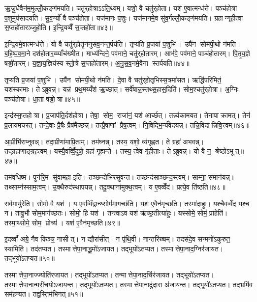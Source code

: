 ऋ॒जु॒धैवैन॑म॒मुल्लोँ॒कङ्ग॑मयति। चतु॑र्‌होत्राऽऽति॒थ्यम्। यशो॒ वै चतु॑र्‌होता। यश॑ ए॒वात्मन्ध॑त्ते। पञ्च॑होत्रा प॒शुमुप॑सादयति। सु॒व॒र्ग्यो॑ वै पञ्च॑होता। यज॑मानः प॒शुः। यज॑मानमे॒व सु॑व॒र्गल्लोँ॒कङ्ग॑मयति। ग्रहान्गृही॒त्वा स॒प्तहो॑तारञ्जुहोति। इ॒न्द्रि॒यव्वैँ स॒प्तहो॑ता॥४३॥

इ॒न्द्रि॒यमे॒वात्मन्ध॑त्ते। यो वै चतु॑र्‌होतॄननुसव॒नन्त॒र्पय॑ति। तृप्य॑ति प्र॒जया॑ प॒शुभि॑। उपै॑न सोमपी॒थो न॑मति। ब॒हि॒ष्प॒व॒मा॒ने दश॑होतार॒व्व्याँच॑ख्षीत। माध्य॑न्दिने॒ पव॑माने॒ चतु॑र्‌होतारम्। आर्भ॑वे॒ पव॑माने॒ पञ्च॑होतारम्। पि॒तृ॒य॒ज्ञे षड्ढो॑तारम्। य॒ज्ञा॒य॒ज्ञिय॑स्य स्तो॒त्रे स॒प्तहो॑तारम्। अ॒नु॒स॒व॒नमे॒वैना स्तर्पयति॥४४॥

तृप्य॑ति प्र॒जया॑ प॒शुभि॑। उपै॑न सोमपी॒थो न॑मति। दे॒वा वै चतु॑र्‌होतृभिस्स॒त्रमा॑सत। ऋद्धि॑परिमितं॒ यश॑स्कामाः। तेऽब्रुवन्न्। यन्न॑ प्रथ॒मय्यँश॑ ऋ॒च्छात्। सर्वे॑षान्न॒स्तथ्स॒हास॒दिति॑। सोम॒श्चतु॑र्‌होत्रा। अ॒ग्निः पञ्च॑होत्रा। धा॒ता षड्ढोत्रा॥४५॥

इन्द्र॑स्स॒प्तहोत्रा। प्र॒जाप॑ति॒र्दश॑होत्रा। तेषा॒ सोम॒ राजा॑नं॒ यश॑ आर्च्छत्। तन्न्य॑कामयत। तेनापाक्रामत्। तेन॑ प्र॒लाय॑मचरत्। तन्दे॒वाः प्रै॒षैः प्रैष॑मैच्छन्न्। तत्प्रै॒षाणां प्रैष॒त्वम्। नि॒विद्भि॒र्न्य॑वेदयन्न्। तन्नि॒विदान्निवि॒त्त्वम्॥४६॥

आ॒प्रीभि॑राप्नुवन्न्। तदा॒प्रीणा॑माप्रि॒त्वम्। तम॑घ्नन्न्। तस्य॒ यशो॒ व्य॑गृह्णत। ते ग्रहा॑ अभवन्न्। तद्ग्रहा॑णाङ्ग्रह॒त्वम्। यस्यै॒वव्विँ॒दुषो॒ ग्रहा॑ गृ॒ह्यन्ते। तस्य॒ त्वे॑व गृ॑ही॒ताः। तेऽब्रुवन्न्। यो वै न॒ श्रेष्ठोऽभूत्॥४७॥

तम॑वधिष्म। पुन॑रि॒म सु॑वामहा॒ इति॑। तञ्छन्दो॑भिरसुवन्त। तच्छन्द॑साञ्छन्द॒स्त्वम्। साम्ना॒ समान॑यन्न्। तथ्साम्न॑स्साम॒त्वम्। उ॒क्थैरुद॑स्थापयन्न्। तदु॒क्थाना॑मुक्थ॒त्वम्। य ए॒वव्वेँद॑। प्रत्ये॒व ति॑ष्ठति॥४८॥

सर्व॒मायु॑रेति। सोमो॒ वै यश॑। य ए॒वव्विँ॒द्वान्थ्सोम॑मा॒गच्छ॑ति। यश॑ ए॒वैन॑मृच्छति। तस्मा॑दाहुः। यश्चै॒वव्वेँद॒ यश्च॒ न। तावु॒भौ सोम॒माग॑च्छतः। सोमो॒ हि यश॑। तन्त्वाऽव यश॑ ऋच्छ॒तीत्या॑हुः। यस्सोमे॒ सोमं॒ प्राहेति॑। तस्मा॒थ्सोमे॒ सोम॒ प्रोच्य॑। यश॑ ए॒वैन॑मृच्छति॥४९॥

इ॒दव्वाँ अग्रे॒ नैव किञ्च॒ नासीत्। न द्यौरा॑सीत्। न पृ॑थि॒वी। नान्तरि॑ख्षम्। तदस॑दे॒व सन्मनो॑ऽकुरुत॒ स्यामिति॑। तद॑तप्यत। तस्मात्तेपा॒नाद्धू॒मो॑ऽजायत। तद्भूयो॑ऽतप्यत। तस्मात्तेपा॒नाद॒ग्निर॑जायत। तद्भूयो॑ऽतप्यत॥५०॥

तस्मात्तेपा॒नाज्ज्योति॑रजायत। तद्भूयो॑ऽतप्यत। तन्मात्तेपा॒नाद॒र्चिर॑जायत। तद्भूयो॑ऽतप्यत। तस्मात्तेपा॒नान्मरी॑चयोऽजायन्त। तद्भूयो॑ऽतप्यत। तस्मात्तेपा॒नादु॑दा॒रा अ॑जायन्त। तद्भूयो॑ऽतप्यत। तद॒भ्रमि॑व॒ सम॑हन्यत। तद्व॒स्तिम॑भिनत्॥५१॥

